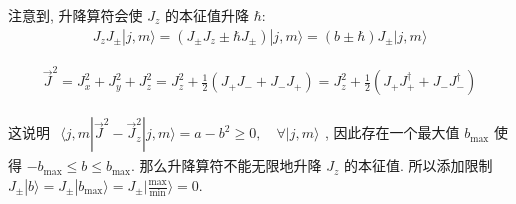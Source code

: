 \documentclass[../../main.tex]{subfiles}
\begin{document}
注意到, 升降算符会使 $J_{z}$ 的本征值升降 $\hbar$:
\begin{align*}
    J_{z}J_{\pm}|j,m\rangle = (J_{\pm}J_{z}\pm\hbar J_{\pm})|j,m\rangle = (b\pm\hbar)J_{\pm}|j,m\rangle
\end{align*}

\begin{align*}
    \vec{J}^{2} = J_{x}^{2} + J_{y}^{2} + J_{z}^{2} = J_{z}^{2} + \frac{1}{2}\left(J_{+}J_{-} + J_{-}J_{+}\right) = J_{z}^{2} + \frac{1}{2}\left(J_{+}J_{+}^{\dagger} + J_{-}J_{-}^{\dagger}\right)
\end{align*}

这说明 $\begin{aligned}
    \langle j,m|\vec{J}^{2}-\vec{J}_{z}^{2}|j,m\rangle = a - b^{2} \geq 0,\quad \forall |j,m\rangle
\end{aligned}$, 
因此存在一个最大值 $b_{\text{max}}$ 使得  $-b_{\text{max}}\leq b\leq b_{\text{max}}$. 那么升降算符不能无限地升降 $J_{z}$ 的本征值. 所以添加限制 $J_{\pm}|b\rangle=J_{\pm} |b_{\text{max}}\rangle = J_{\pm}|\frac{\text{max}}{\text{min}}\rangle =  0$. 
\end{document}

